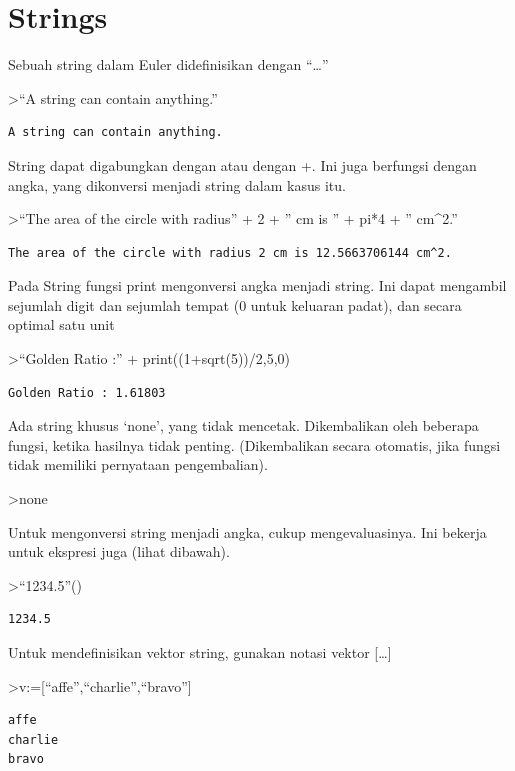\documentclass[
]{book}
\begin{document}
\section{Strings}\label{strings}

Sebuah string dalam Euler didefinisikan dengan ``\ldots{}''

\textgreater{}``A string can contain anything.''

\begin{verbatim}
A string can contain anything.
\end{verbatim}

String dapat digabungkan dengan \textbar{} atau dengan +. Ini juga berfungsi dengan angka, yang dikonversi menjadi string dalam kasus itu.

\textgreater{}``The area of the circle with radius'' + 2 + '' cm is '' + pi*4 + '' cm\^{}2.''

\begin{verbatim}
The area of the circle with radius 2 cm is 12.5663706144 cm^2.
\end{verbatim}

Pada String fungsi print mengonversi angka menjadi string. Ini dapat mengambil sejumlah digit dan sejumlah tempat (0 untuk keluaran padat), dan secara optimal satu unit

\textgreater{}``Golden Ratio :'' + print((1+sqrt(5))/2,5,0)

\begin{verbatim}
Golden Ratio : 1.61803
\end{verbatim}

Ada string khusus `none', yang tidak mencetak. Dikembalikan oleh beberapa fungsi, ketika hasilnya tidak penting. (Dikembalikan secara otomatis, jika fungsi tidak memiliki pernyataan pengembalian).

\textgreater none

Untuk mengonversi string menjadi angka, cukup mengevaluasinya. Ini bekerja untuk ekspresi juga (lihat dibawah).

\textgreater{}``1234.5''()

\begin{verbatim}
1234.5
\end{verbatim}

Untuk mendefinisikan vektor string, gunakan notasi vektor {[}\ldots{]}

\textgreater v:={[}``affe'',``charlie'',``bravo''{]}

\begin{verbatim}
affe
charlie
bravo
\end{verbatim}
\end{document}
